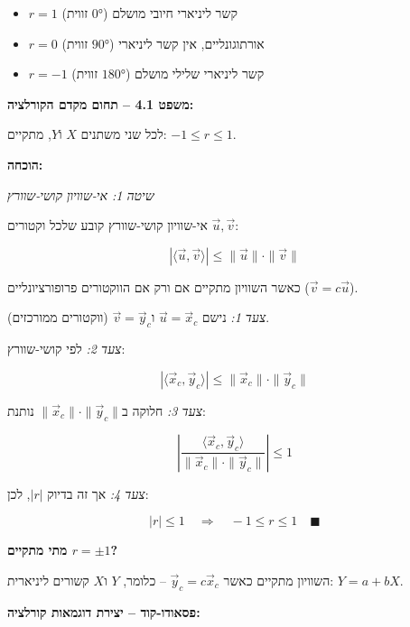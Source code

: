 \begin{itemize}
\item $r = 1$ (זווית $0°$) \rarrow{} קשר ליניארי חיובי מושלם
\item $r = 0$ (זווית $90°$) \rarrow{} אורתוגונליים, אין קשר ליניארי
\item $r = -1$ (זווית $180°$) \rarrow{} קשר ליניארי שלילי מושלם
\end{itemize}


\textbf{משפט \num{4.1} – תחום מקדם הקורלציה:}

לכל שני משתנים $X$ ו\en{-}$Y$, מתקיים: $-1 \leq r \leq 1$.

\textbf{הוכחה:}

\textit{שיטה 1: אי-שוויון קושי-שוורץ}

אי-שוויון קושי-שוורץ  קובע שלכל וקטורים $\vec{u}, \vec{v}$:

\begin{equation}
|\langle \vec{u}, \vec{v} \rangle| \leq \|\vec{u}\| \cdot \|\vec{v}\|
\end{equation}

כאשר השוויון מתקיים אם ורק אם הווקטורים פרופורציונליים ($\vec{v} = c\vec{u}$).

\textit{צעד 1:} נישם $\vec{u} = \vec{x}_c$ ו\en{-}$\vec{v} = \vec{y}_c$ (ווקטורים ממורכזים).

\textit{צעד 2:} לפי קושי-שוורץ:

\[
|\langle \vec{x}_c, \vec{y}_c \rangle| \leq \|\vec{x}_c\| \cdot \|\vec{y}_c\|
\]

\textit{צעד 3:} חלוקה ב\en{-}$\|\vec{x}_c\| \cdot \|\vec{y}_c\|$ נותנת:

\[
\left|\frac{\langle \vec{x}_c, \vec{y}_c \rangle}{\|\vec{x}_c\| \cdot \|\vec{y}_c\|}\right| \leq 1
\]

\textit{צעד 4:} אך זה בדיוק $|r|$, לכן:

\[
|r| \leq 1 \quad \Rightarrow \quad -1 \leq r \leq 1 \quad \blacksquare
\]

\textbf{מתי מתקיים $r = \pm 1$?}

השוויון מתקיים כאשר $\vec{y}_c = c\vec{x}_c$ – כלומר, $Y$ ו\en{-}$X$ קשורים ליניארית: $Y = a + bX$.


\textbf{פסאודו-קוד – יצירת דוגמאות קורלציה:}

